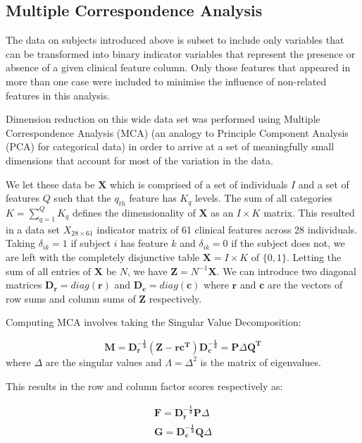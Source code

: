 \documentclass[
  authoryear,
  preprint,
  3p]{elsarticle}
\begin{document}
\hypertarget{multiple-correspondence-analysis}{%
\subsection{Multiple Correspondence
Analysis}\label{multiple-correspondence-analysis}}

The data on subjects introduced above is subset to include only
variables that can be transformed into binary indicator variables that
represent the presence or absence of a given clinical feature column.
Only those features that appeared in more than one case were included to
minimise the influence of non-related features in this analysis.

Dimension reduction on this wide data set was performed using Multiple
Correspondence Analysis (MCA) (an analogy to Principle Component
Analysis (PCA) for categorical data) \citep{le2010multiple} in order to
arrive at a set of meaningfully small dimensions that account for most
of the variation in the data.

We let these data be \(\mathbf{X}\) which is comprised of a set of
individuals \(I\) and a set of features \(Q\) such that the \(q_{th}\)
feature has \(K_q\) levels. The sum of all categories
\(K = \sum_{q=1}^{Q}K_q\) defines the dimensionality of \(\mathbf{X}\)
as an \(I\times K\) matrix. This resulted in a data set
\(X_{28 \times 61}\) indicator matrix of 61 clinical features across 28
individuals. Taking \(\delta_{ik} = 1\) if subject \(i\) has feature
\(k\) and \(\delta_{ik} = 0\) if the subject does not, we are left with
the completely disjunctive table \(\mathbf{X} = I\times K\) of
\(\{0,1\}\). Letting the sum of all entries of \(\mathbf{X}\) be \(N\),
we have \(\mathbf{Z} = N^{-1}\mathbf{X}\). We can introduce two diagonal
matrices \(\mathbf{D_r} = diag(\mathbf{r})\) and
\(\mathbf{D_c} = diag(\mathbf{c})\) where \(\mathbf{r}\) and
\(\mathbf{c}\) are the vectors of row sums and column sums of
\(\mathbf{Z}\) respectively.

Computing MCA involves taking the Singular Value Decomposition:

\[
\mathbf{M = D_r^{-\frac{1}{2}}(Z-rc^T)D_c^{-\frac{1}{2}}} = \mathbf{P}\Delta\mathbf{Q^T}
\] where \(\Delta\) are the singular values and \(\Lambda = \Delta^2\)
is the matrix of eigenvalues.

This results in the row and column factor scores respectively as:

\[
\begin{split}
\mathbf{F} = \mathbf{D_r^{-\frac{1}{2}}P}\Delta \\
\mathbf{G = D_c^{-\frac{1}{2}}Q}\Delta
\end{split}
\]
\end{document}
